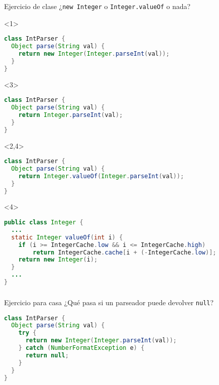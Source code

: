 \begin{frame}[fragile]
  \frametitle{\ft}
  \begin{block}{Ejercicio de clase}
    ¿{\tt new Integer} o {\tt Integer.valueOf} o nada?
    \begin{onlyenv}<1>
    \begin{lstlisting}[language=java]
class IntParser {
  Object parse(String val) {
    return new Integer(Integer.parseInt(val));
  }
}
    \end{lstlisting}
    \end{onlyenv}
    \begin{onlyenv}<3>
    \begin{lstlisting}[language=java]
class IntParser {
  Object parse(String val) {
    return Integer.parseInt(val);
  }
}
    \end{lstlisting}
    \end{onlyenv}
    \begin{onlyenv}<2,4>
    \begin{lstlisting}[language=java]
class IntParser {
  Object parse(String val) {
    return Integer.valueOf(Integer.parseInt(val));
  }
}
    \end{lstlisting}
    \end{onlyenv}

    \begin{visibleenv}<4>
    \begin{lstlisting}[language=java]
public class Integer {
  ...
  static Integer valueOf(int i) {
    if (i >= IntegerCache.low && i <= IntegerCache.high)
        return IntegerCache.cache[i + (-IntegerCache.low)];
    return new Integer(i);
  }
  ...
}
    \end{lstlisting}
    \end{visibleenv}
  \end{block}
\end{frame}


\begin{frame}[fragile]
  \frametitle{\ft}
  \begin{block}{Ejercicio para casa}
    ¿Qué pasa si un parseador puede devolver {\tt null}?
    \begin{lstlisting}[language=java]
class IntParser {
  Object parse(String val) {
    try {
      return new Integer(Integer.parseInt(val));
    } catch (NumberFormatException e) {
      return null;
    }
  }
}
    \end{lstlisting}
  \end{block}
\end{frame}



